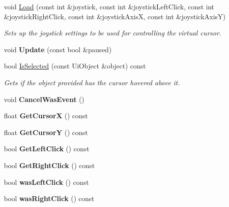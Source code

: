 \begin{DoxyCompactItemize}
\item 
void \hyperlink{class_flounder_1_1_ui_selector_a1564745e82c98c75c16dac5813639177}{Load} (const int \&joystick, const int \&joystick\+Left\+Click, const int \&joystick\+Right\+Click, const int \&joystick\+AxisX, const int \&joystick\+AxisY)
\begin{DoxyCompactList}\small\item\em Sets up the joystick settings to be used for controlling the virtual cursor. \end{DoxyCompactList}\item 
\mbox{\label{class_flounder_1_1_ui_selector_ae370dd173db25c1f6287cec4c92cd347}} 
void {\bfseries Update} (const bool \&paused)
\item 
bool \hyperlink{class_flounder_1_1_ui_selector_a67bbc0090d8ac728e7697dab7044a356}{Is\+Selected} (const Ui\+Object \&object) const
\begin{DoxyCompactList}\small\item\em Gets if the object provided has the cursor hovered above it. \end{DoxyCompactList}\item 
\mbox{\label{class_flounder_1_1_ui_selector_a7895e1ea40144313bee291411d33717a}} 
void {\bfseries Cancel\+Was\+Event} ()
\item 
\mbox{\label{class_flounder_1_1_ui_selector_af80b4fabc0df787005c7377e2db5c86c}} 
float {\bfseries Get\+CursorX} () const
\item 
\mbox{\label{class_flounder_1_1_ui_selector_a995bd2996be23643f44ca696758ba575}} 
float {\bfseries Get\+CursorY} () const
\item 
\mbox{\label{class_flounder_1_1_ui_selector_aaee7aa0999d2499869958d99a51a688d}} 
bool {\bfseries Get\+Left\+Click} () const
\item 
\mbox{\label{class_flounder_1_1_ui_selector_a34dee0ebd56922c65a15548cdbc0e2a6}} 
bool {\bfseries Get\+Right\+Click} () const
\item 
\mbox{\label{class_flounder_1_1_ui_selector_a0dd2a1cb43d6065adabfa338a794bfe6}} 
bool {\bfseries was\+Left\+Click} () const
\item 
\mbox{\label{class_flounder_1_1_ui_selector_a5807b3f5d59b21703b64f129c83e0d22}} 
bool {\bfseries was\+Right\+Click} () const
\end{DoxyCompactItemize}
